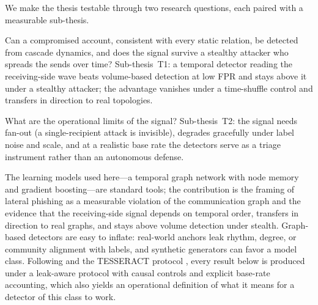We make the thesis testable through two research questions, each paired with a measurable sub-thesis.
\begin{description}[leftmargin=1.4em,noitemsep,topsep=2pt]
  \item[RQ1 (signal).] Can a compromised account, consistent with every static relation, be detected from
  cascade dynamics, and does the signal survive a stealthy attacker who spreads the sends over time?
  Sub-thesis~T1: a temporal detector reading the receiving-side wave beats volume-based detection at low FPR
  and stays above it under a stealthy attacker; the advantage vanishes under a
  time-shuffle control and transfers in direction to real topologies.
  \item[RQ2 (limits).] What are the operational limits of the signal? Sub-thesis~T2: the signal needs
  fan-out (a single-recipient attack is invisible), degrades gracefully under label noise and scale, and at
  a realistic base rate the detectors serve as a triage instrument rather than an autonomous defense.
\end{description}
\noindent The learning models used here---a temporal graph network with node memory and gradient
boosting---are standard tools; the contribution is the framing of lateral phishing as a measurable violation of
the communication graph and the evidence that the receiving-side signal depends on temporal order, transfers in direction to real
graphs, and stays above volume detection under stealth. Graph-based detectors are easy to inflate: real-world anchors leak rhythm, degree, or community
alignment with labels, and synthetic generators can favor a model class. Following \citet{arp2022dos} and the
TESSERACT protocol \citep{pendlebury2019tesseract}, every result below is produced under a leak-aware protocol
with causal controls and explicit base-rate accounting, which also yields an operational definition of what it
means for a detector of this class to work.

